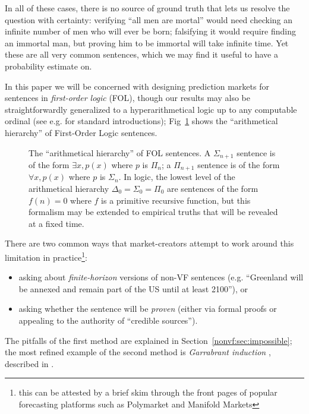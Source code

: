 In all of these cases, there is no source of ground truth that lets us resolve the question with certainty: verifying ``all men are mortal'' would need checking an infinite number of men who will ever be born; falsifying it would require finding an immortal man, but proving him to be immortal will take infinite time. Yet these are all very common sentences, which we may find it useful to have a probability estimate on.

In this paper we will be concerned with designing prediction markets for sentences in \emph{first-order logic} (FOL), though our results may also be straightforwardly generalized to a hyperarithmetical logic up to any computable ordinal (see e.g. \citet{pohlersComputabilityTheoryHyperarithmetical1999, ashComputableStructuresHyperarithmetical2000, moschovakisDescriptiveSetTheory2009, kechrisClassicalDescriptiveSet1995} for standard introductions); Fig~\ref{nonvf:fig:fol} shows the ``arithmetical hierarchy'' of First-Order Logic sentences.

\begin{figure}
    \centering
    
    \caption{The ``arithmetical hierarchy'' of FOL sentences. A $\Sigma_{n+1}$ sentence is of the form $\exists x,p(x)$ where $p$ is $\Pi_n$; a $\Pi_{n+1}$ sentence is of the form $\forall x,p(x)$ where $p$ is $\Sigma_n$. In logic, the lowest level of the arithmetical hierarchy $\Delta_0=\Sigma_0=\Pi_0$ are sentences of the form $f(n)=0$ where $f$ is a primitive recursive function, but this formalism may be extended to empirical truths that will be revealed at a fixed time.}
    \label{nonvf:fig:fol}
\end{figure}

There are two common ways that market-creators attempt to work around this limitation in practice\footnote{this can be attested by a brief skim through the front pages of popular forecasting platforms such as Polymarket and Manifold Markets}:
\begin{itemize}
\item asking about \emph{finite-horizon} versions of non-VF sentences (e.g. ``Greenland will be annexed and remain part of the US until at least 2100''), or
\item asking whether the sentence will be \emph{proven} (either via formal proofs or appealing to the authority of ``credible sources'').
\end{itemize}
The pitfalls of the first method are explained in Section~\ref{nonvf:sec:impossible}; the most refined example of the second method is \emph{Garrabrant induction} \citep{garrabrantLogicalInduction2020}, described in .

